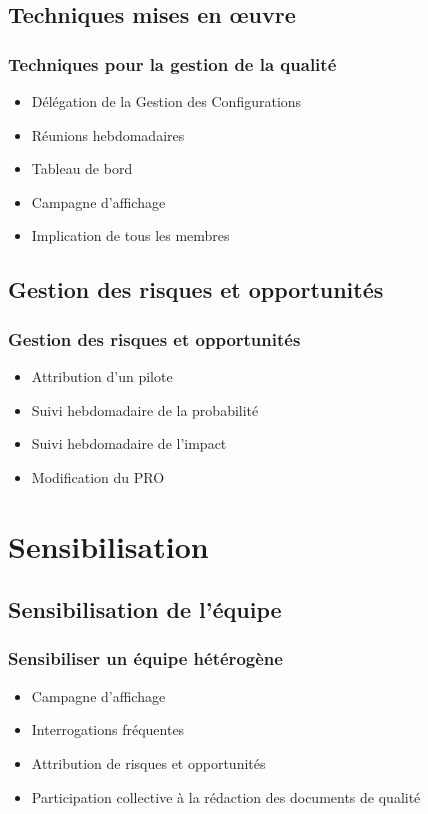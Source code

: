 \documentclass[compress,xcolor=dvipsnames]{beamer}
\begin{document}
\subsection{Techniques mises en \oe{}uvre}
\begin{frame}
\frametitle{Techniques pour la gestion de la qualité}
\begin{itemize}
\item Délégation de la Gestion des Configurations
\item Réunions hebdomadaires
\item Tableau de bord
\item Campagne d'affichage
\item Implication de tous les membres
\end{itemize}
\end{frame}

\subsection{Gestion des risques et opportunités}
\begin{frame}
\frametitle{Gestion des risques et opportunités}
\begin{itemize}
\item Attribution d'un pilote
\item Suivi hebdomadaire de la probabilité
\item Suivi hebdomadaire de l'impact
\item Modification du PRO
\end{itemize}
\end{frame}


\section{Sensibilisation}
\subsection{Sensibilisation de l’équipe}
\begin{frame}
\frametitle{Sensibiliser un équipe hétérogène}
\begin{itemize}
\item Campagne d'affichage
\item Interrogations fréquentes
\item Attribution de risques et opportunités
\item Participation collective à la rédaction des documents de qualité
\end{itemize}
\end{frame}
\end{document}
